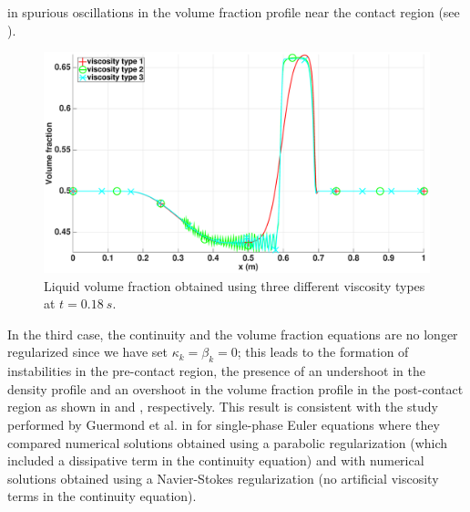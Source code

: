 in spurious oscillations in the volume fraction profile near the contact region (see ). 
%
\begin{figure}[H]
        \centering
        \includegraphics[width=\textwidth]{figures/relaxation_liquid_vf_multiple_visc.eps}
        \caption{Liquid volume fraction obtained using three different viscosity types at $t=0.18 \ s$.}
        \label{fig:liq-vf}
\end{figure}
%
In the third case, the continuity and the volume fraction equations are no longer regularized since we have set $\kappa_k=\beta_k=0$; this leads to 
the formation of instabilities in the pre-contact region, the presence of an undershoot in the density profile and an overshoot in the volume 
fraction profile in the post-contact region as shown in  and , respectively. This result is consistent with 
the study performed by Guermond et al. in \cite{jlg} for single-phase Euler equations where they compared numerical solutions obtained using 
a parabolic regularization (which included a dissipative term in the continuity equation) and with numerical solutions obtained using a 
Navier-Stokes regularization (no artificial viscosity terms in the continuity equation).
%
